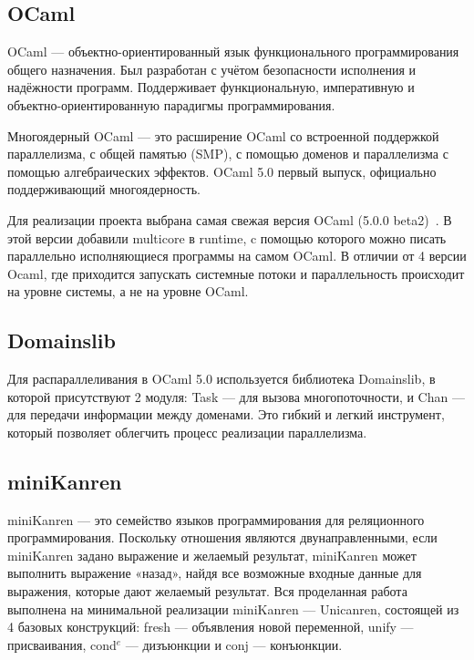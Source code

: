 \subsection{OCaml} OCaml --- объектно-ориентированный язык
функционального программирования общего назначения.
Был разработан с учётом безопасности исполнения и надёжности 
программ. Поддерживает функциональную, императивную
и объектно-ориентированную парадигмы программирования. 

Многоядерный OCaml --- это расширение OCaml со
встроенной поддержкой параллелизма, с
общей памятью (SMP), с помощью доменов и
параллелизма с помощью алгебраических эффектов. 
OCaml 5.0 первый 
выпуск, официально поддерживающий многоядерность.

Для реализации проекта выбрана самая свежая версия OCaml (5.0.0 beta2)~\cite{ocaml}.
В этой версии добавили multicore в runtime, c помощью которого можно
писать параллельно исполняющиеся программы на самом OCaml. В отличии от 4 версии
Ocaml, где приходится запускать системные потоки и параллельность происходит на уровне системы, 
а не на уровне OCaml.

\subsection{Domainslib} Для распараллеливания в OCaml 5.0 
используется библиотека Domainslib, в 
которой присутствуют 2 модуля: Task --- для вызова
многопоточности, и Chan --- для передачи информации между
доменами. Это гибкий и легкий инструмент, который позволяет 
облегчить процесс реализации параллелизма.

\subsection{miniKanren} miniKanren --- это семейство 
языков программирования для реляционного программирования. 
Поскольку отношения являются двунаправленными, если miniKanren 
задано выражение и желаемый результат, miniKanren может выполнить 
выражение «назад», найдя все возможные входные данные для 
выражения, которые дают желаемый результат.
Вся проделанная работа выполнена на минимальной реализации
miniKanren --- Unicanren, состоящей из 4 базовых конструкций:
fresh --- объявления новой переменной, unify --- присваивания, cond$^e$ --- дизъюнкции и conj --- конъюнкции.

